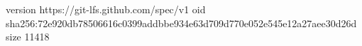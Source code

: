 version https://git-lfs.github.com/spec/v1
oid sha256:72e920db78506616c0399addbbe934e63d709d770e052e545e12a27aee30d26d
size 11418
